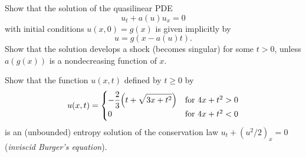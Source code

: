 \begin{problem}
  Show that the solution of the quasilinear PDE
  \[
    u_t+a(u)u_x=0
  \]
  with initial conditions \(u(x,0)=g(x)\) is given implicitly by
  \[
    u=g(x-a(u)t).
  \]
  Show that the solution develops a shock (becomes singular) for some
  \(t>0\), unless \(a(g(x))\) is a nondecreasing function of
  \(x\).
\end{problem}
\begin{solution}

\end{solution}
\newpage

\begin{problem}
  Show that the function \(u(x,t)\) defined by \(t\geq 0\) by
  \[
    u(x,t)=
    \begin{cases}
      \displaystyle-\frac{2}{3}\Bigl(t+\sqrt{3x+t^2}\Bigr)
      &\text{for \(4x+t^2>0\)}\\
      0
      &\text{for \(4x+t^2<0\)}
    \end{cases}
  \]
  is an (unbounded) entropy solution of the conservation law
  \(u_t+(u^2/2)_x=0\) (\emph{inviscid Burger's equation}).
\end{problem}
\begin{solution}
\end{solution}

